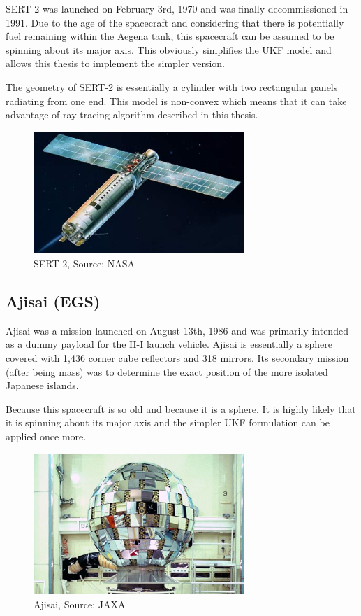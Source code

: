 SERT-2 was launched on February 3rd, 1970 and was finally decommissioned in 1991. Due to the age of the spacecraft and considering that there is potentially fuel remaining within the Aegena tank, this spacecraft can be assumed to be spinning about its major axis. This obviously simplifies the UKF model and allows this thesis to implement the simpler version.

The geometry of SERT-2 is essentially a cylinder with two rectangular panels radiating from one end. This model is non-convex which means that it can take advantage of ray tracing algorithm described in this thesis. 

\begin{figure}
	\centering
	\includegraphics[width = 80mm]{figures/sert-2}
	\caption{SERT-2, Source: NASA}
\end{figure}


\subsection{Ajisai (EGS)}

Ajisai was a mission launched on August 13th, 1986 and was primarily intended as a dummy payload for the H-I launch vehicle. \cite{ajisai_jaxa} Ajisai is essentially a sphere covered with 1,436 corner cube reflectors and 318 mirrors. \cite{ajisai} Its secondary mission (after being mass) was to determine the exact position of the more isolated Japanese islands. \cite{ajisai_jaxa}

Because this spacecraft is so old and because it is a sphere. It is highly likely that it is spinning about its major axis and the simpler UKF formulation can be applied once more.

\begin{figure}
	\centering
	\includegraphics[width = 80mm]{figures/ajisai.jpg}
	\caption{Ajisai, Source: JAXA}
\end{figure}

